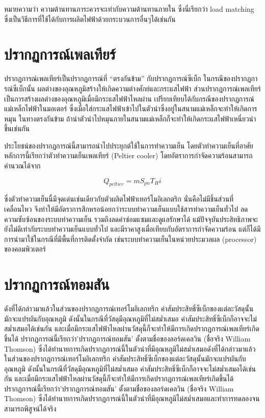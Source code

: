 \documentclass[a4paper,nobib,openany]{tufte-book}
\begin{document}
หมายความว่า ความต้านทานภาระควรจะเท่ากับความต้านทานภายใน ซึ่งนี่เรียกว่า
load matching
ซึ่งเป็นวิธีการที่ใช้ได้กับการผลิตไฟฟ้าด้วยกระบวนการอื่นๆได้เช่นกัน

\section{ปรากฏการณ์เพลเทียร์}
\label{sec:orge821d09}
ปรากฏการณ์เพลเทียร์เป็นปรากฏการณ์ที่ ``ตรงกันข้าม'' กับปรากฏการณ์ซีเบ็ก
ในกรณีของปรากฏการณ์ซีเบ็กนั้น
ผลต่างของอุณหภูมิสร้างให้เกิดความต่างศักย์และกระแสไฟฟ้า
ส่วนปรากฏการณ์เพลเทียร์เป็นการสร้างผลต่างของอุณหภูมิเมื่อมีกระแสไฟฟ้าไหลผ่าน
เปรียบเทียบได้กับกรณีของปรากฏการณ์แม่เหล็กไฟฟ้าในมอเตอร์
ซึ่งเมื่อใส่กระแสไฟฟ้าเข้าไปในตัวนำซึ่งอยู่ในสนามแม่เหล็กจะทำให้เกิดการหมุน
ในทางตรงกันข้าม
ถ้านำตัวนำไปหมุนภายในสนามแม่เหล็กก็จะทำให้เกิดกระแสไฟฟ้าเหนี่ยวนำขึ้นเช่นกัน

ประโยชน์ของปรากฏการณ์นี้สามารถนำไปประยุกต์ใช้ในการทำความเย็น
โดยตัวทำความเย็นที่อาศัยหลักการนี้เรียกว่าตัวทำความเย็นเพลเทียร์
(Peltier cooler) โดยอัตราการกำจัดความร้อนสามารถคำนวณได้จาก

\begin{equation}
  Q_{peltier} = m S_{pn} T_H i
\end{equation}

ซึ่งตัวทำความเย็นนี้มีจุดเด่นเช่นเดียวกับตัวผลิตไฟฟ้าเทอร์โมอิเลกตริก
นั่นคือไม่มีชิ้นส่วนที่เคลื่อนไหว
จึงทำให้มีอัตราการสึกหรอน้อยกว่าระบบทำความเย็นแบบใช้สารทำความเย็นทั่วไป
ลดความซับซ้อนของระบบทำความเย็น รวมถึงลดค่าซ่อมแซมและดูแลรักษาได้
แม้ปัจจุบันประสิทธิภาพจะยังไม่ดีเท่ากับระบบทำความเย็นแบบทั่วไป
และมีราคาสูงเมื่อเทียบกับอัตราการกำจัดความร้อน
แต่ก็ได้มีการนำมาใช้ในกรณีที่มีพื้นที่การติดตั้งจำกัด
เช่นระบบทำความเย็นในหน่วยประมวลผล (processor) ของคอมพิวเตอร์

\section{ปรากฏการณ์ทอมสัน}
\label{sec:org5b81a86}
ดังที่ได้กล่าวมาแล้วในส่วนของปรากฏการณ์เทอร์โมอิเลกทริก
ค่าสัมประสิทธิ์ซีเบ็กของแต่ละวัสดุนั้นมักจะแปรผันกับอุณหภูมิ
ดังนั้นในกรณีที่วัสดุมีอุณหภูมิที่ไม่สม่ำเสมอ
ค่าสัมประสิทธิ์ซีเบ็กก็อาจจะไม่สม่ำเสมอได้เช่นกัน
และเมื่อมีกระแสไฟฟ้าไหลผ่านวัสดุนี้ก็จะทำให้มีการเกิดปรากฏการณ์เพลเทียร์เกิดขึ้นได้
ปรากฏการณ์นี้เรียกว่า'ปรากฏการณ์ทอมสัน' ตั้งตามชื่อของลอร์ดเคลวิน
(ชื่อจริง William Thomson)
ซึ่งได้ทำนายการเกิดปรากฏการณ์นี้ในตัวนำที่มีอุณหภูมิไม่สม่ำเสมอดังที่ได้กล่าวมาแล้วในส่วนของปรากฏการณ์เทอร์โมอิเลกทริก
ค่าสัมประสิทธิ์ซีเบ็กของแต่ละวัสดุนั้นมักจะแปรผันกับอุณหภูมิ
ดังนั้นในกรณีที่วัสดุมีอุณหภูมิที่ไม่สม่ำเสมอ
ค่าสัมประสิทธิ์ซีเบ็กก็อาจจะไม่สม่ำเสมอได้เช่นกัน
และเมื่อมีกระแสไฟฟ้าไหลผ่านวัสดุนี้ก็จะทำให้มีการเกิดปรากฏการณ์เพลเทียร์เกิดขึ้นได้
ปรากฏการณ์นี้เรียกว่า'ปรากฏการณ์ทอมสัน' ตั้งตามชื่อของลอร์ดเคลวิน
(ชื่อจริง William Thomson)
ซึ่งได้ทำนายการเกิดปรากฏการณ์นี้ในตัวนำที่มีอุณหภูมิไม่สม่ำเสมอและทำการทดลองจนสามารถพิสูจน์ได้จริง
\end{document}
